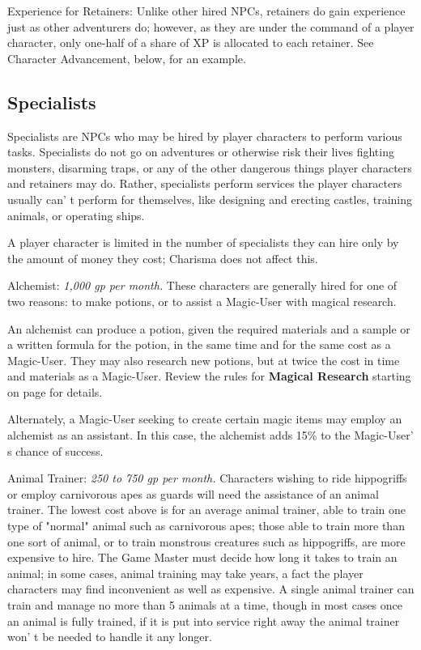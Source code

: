 \documentclass[a4paper,twoside,openany,10pt]{book}
\begin{document}
\begin{multicols}{2}
Experience for Retainers: Unlike other hired NPCs, retainers do gain experience just as other adventurers do; however, as they are under the command of a player character, only one-half of a share of XP is allocated to each retainer. See Character Advancement, below, for an example.

\subsection{Specialists}\label{specialists}

Specialists are NPCs who may be hired by player characters to perform various tasks. Specialists do not go on adventures or otherwise risk their lives fighting monsters, disarming traps, or any of the other dangerous things player characters and retainers may do. Rather, specialists perform services the player characters usually can' t perform for themselves, like designing and erecting castles, training animals, or operating ships.

A player character is limited in the number of specialists they can hire only by the amount of money they cost; Charisma does not affect this.

\hypertarget{Alchemistux20Entry}{}\label{Alchemistux20Entry}Alchemist: \emph{ 1,000 gp per month. }These characters are generally hired for one of two reasons: to make potions, or to assist a Magic-User with magical research.

An alchemist can produce a potion, given the required materials and a sample or a written formula for the potion, in the same time and for the same cost as a Magic-User. They may also research new potions, but at twice the cost in time and materials as a Magic-User. Review the rules for \textbf{Magical Research }starting on page \hyperlink{character-races}{\pageref{character-races}} for details.

Alternately, a Magic-User seeking to create certain magic items may employ an alchemist as an assistant. In this case, the alchemist adds 15\% to the Magic-User' s chance of success.

Animal Trainer: \emph{250 to 750 gp per month.} Characters wishing to ride hippogriffs or employ carnivorous apes as guards will need the assistance of an animal trainer. The lowest cost above is for an average animal trainer, able to train one type of "normal" animal such as carnivorous apes; those able to train more than one sort of animal, or to train monstrous creatures such as hippogriffs, are more expensive to hire. The Game Master must decide how long it takes to train an animal; in some cases, animal training may take years, a fact the player characters may find inconvenient as well as expensive. A single animal trainer can train and manage no more than 5 animals at a time, though in most cases once an animal is fully trained, if it is put into service right away the animal trainer won' t be needed to handle it any longer.


\end{multicols}
\end{document}
